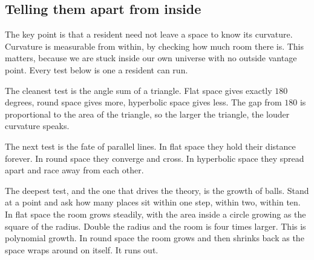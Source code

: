 \begin{table}[h]
\centering
{}
\caption{The three uniform geometries and how to tell them apart from inside.}
\label{tab:three-geometries}
\end{table}

\subsection{Telling them apart from inside}

The key point is that a resident need not leave a space to know its curvature. Curvature is measurable from
within, by checking how much room there is. This matters, because we are stuck inside our own universe with
no outside vantage point. Every test below is one a resident can run.

The cleanest test is the angle sum of a triangle. Flat space gives exactly $180$ degrees, round space gives
more, hyperbolic space gives less. The gap from $180$ is proportional to the area of the triangle, so the
larger the triangle, the louder curvature speaks.

The next test is the fate of parallel lines. In flat space they hold their distance forever. In round space
they converge and cross. In hyperbolic space they spread apart and race away from each other.

The deepest test, and the one that drives the theory, is the growth of balls. Stand at a point and ask how
many places sit within one step, within two, within ten. In flat space the room grows steadily, with the
area inside a circle growing as the square of the radius. Double the radius and the room is four times
larger. This is polynomial growth. In round space the room grows and then shrinks back as the space wraps
around on itself. It runs out.

